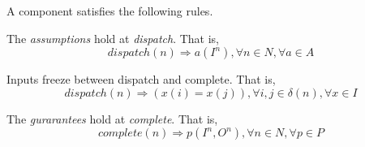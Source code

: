 A component satisfies the following rules.

The \emph{assumptions} hold at \emph{dispatch}. That is,
\begin{equation} 
\label{eqn:assumption}
dispatch(n) \Rightarrow a(I^n), \forall n\in N, \forall a \in A
\end{equation}

Inputs freeze between dispatch and complete. That is,
\begin{equation} 
\label{eqn:inputfreeze}
dispatch(n) \Rightarrow (x(i) = x(j)), \forall i,j\in \delta(n), \forall x \in I
\end{equation}

The \emph{gurarantees} hold at \emph{complete}. That is,
\begin{equation} 
\label{eqn:guarantee}
complete(n) \Rightarrow p(I^n, O^n), \forall n\in N, \forall p \in P
\end{equation}

